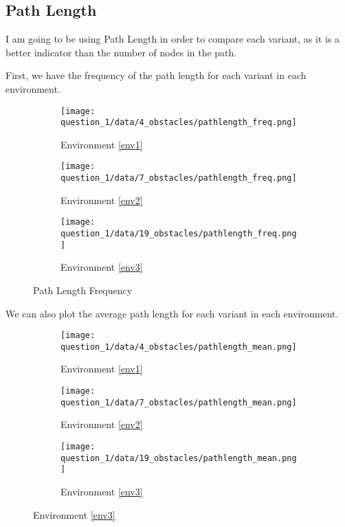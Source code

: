 \documentclass[12pt]{report}
\begin{document}
\subsection{Path Length}

I am going to be using Path Length in order to compare each variant, as it is a better indicator than the number of nodes in the path.

First, we have the frequency of the path length for each variant in each environment.
\begin{figure}[H]
    \centering
    \begin{subfigure}{0.32\textwidth}
        \texttt{[image: question\_1/data/4\_obstacles/pathlength\_freq.png]}
        \caption{Environment \ref{env1}}
    \end{subfigure}
    \begin{subfigure}{0.32\textwidth}
        \texttt{[image: question\_1/data/7\_obstacles/pathlength\_freq.png]}
        \caption{Environment \ref{env2}}
    \end{subfigure}
    \begin{subfigure}{0.32\textwidth}
        \texttt{[image: question\_1/data/19\_obstacles/pathlength\_freq.png]}
        \caption{Environment \ref{env3}}
    \end{subfigure}
    \caption{Path Length Frequency}
\end{figure}

We can also plot the average path length for each variant in each environment.

\begin{figure}[H]
    \centering
    \begin{subfigure}{0.32\textwidth}
        \texttt{[image: question\_1/data/4\_obstacles/pathlength\_mean.png]}
        \caption{Environment \ref{env1}}
    \end{subfigure}
    \begin{subfigure}{0.32\textwidth}
        \texttt{[image: question\_1/data/7\_obstacles/pathlength\_mean.png]}
        \caption{Environment \ref{env2}}
    \end{subfigure}
    \begin{subfigure}{0.32\textwidth}
        \texttt{[image: question\_1/data/19\_obstacles/pathlength\_mean.png]}
        \caption{Environment \ref{env3}}
    \end{subfigure}
\end{figure}
\end{document}
